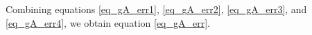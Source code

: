	Combining equations \eqref{eq_gA_err1}, \eqref{eq_gA_err2}, \eqref{eq_gA_err3}, and \eqref{eq_gA_err4}, we obtain equation \eqref{eq_gA_err}.


